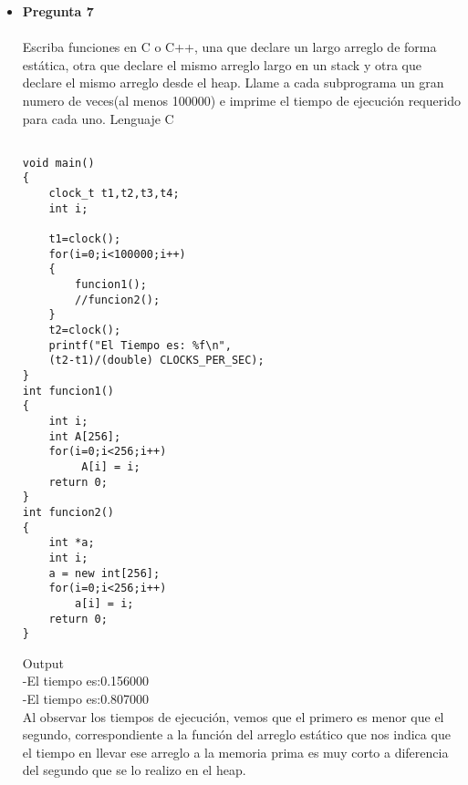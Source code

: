 \documentclass[12pt,oneside]{article}
\begin{document}
\begin{itemize}
Lenguaje C++\\
\begin{lstlisting}[frame=single]  % Start your code-block
using System;
void main(){
	for (int i = 0; i<10; i++){
		printf("%d\n", i);

	}
		
	printf("%d\n", i); 
	//Trata de acceder a la variable i

	getch();
}
\end{lstlisting}
Fuera del FOR, printf intenta acceder a 'i' pero no puede ya que 'i' es declarada dentro for, no es una varialbe global.\\\\


Lenguaje C share\\
\begin{lstlisting}[frame=single]  % Start your code-block
using System;
namespace ConsoleApplication2
{
    
    class Program
    {
         static void Main(string[] args)
        {
            for(int i = 0; i< 10 ; i++){ 
            	Console.WriteLine(i);
      	}
 	    
            Console.WriteLine(i);
	 //Intenta acceder a la variable i
	Console.ReadLine();
	}
        }
}
\end{lstlisting}
OUTPUT\\
Error\\
El nombre i  no existe en el actual contexto\\
Fuera del FOR, Console.WriteLine(i) intenta acceder a 'i' pero no puede ya que 'i' es declarada dentro for, no es una varialbe global.\\\\


\item {\bf Pregunta 7} \\\\
Escriba funciones en C o C++, una que declare un largo arreglo de forma estática, otra que declare el mismo arreglo largo en un stack y otra que declare el mismo arreglo desde el heap. Llame a cada subprograma un gran numero de veces(al menos 100000) e imprime el tiempo de ejecución requerido para cada uno.
Lenguaje C
\begin{lstlisting}[frame=single]

void main()
{
	clock_t t1,t2,t3,t4;
	int i;

	t1=clock(); 
	for(i=0;i<100000;i++)
	{
		funcion1();
		//funcion2();		
	}
	t2=clock(); 
	printf("El Tiempo es: %f\n",
	(t2-t1)/(double) CLOCKS_PER_SEC);
}
int funcion1()
{
	int i;
	int A[256];
	for(i=0;i<256;i++)
	   	 A[i] = i;
	return 0;
}
int funcion2()
{
	int *a;
	int i;
	a = new int[256];
	for(i=0;i<256;i++)
		a[i] = i;  
	return 0;
}
\end{lstlisting}
Output\\
-El tiempo es:0.156000\\
-El tiempo es:0.807000\\
Al observar los tiempos de ejecución, vemos que el primero es menor que el segundo, correspondiente a la función del arreglo estático que nos indica que el tiempo en llevar ese arreglo a la memoria prima es muy corto a diferencia del segundo que se lo realizo en el heap.


\end{itemize}
\end{document}
